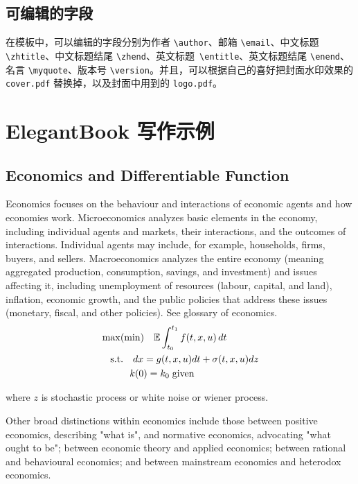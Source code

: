 \documentclass[titlestyle=hang,11pt]{elegantbook}
\begin{document}
\section{可编辑的字段}
在模板中，可以编辑的字段分别为作者 \verb|\author|、邮箱 \verb|\email|、中文标题 \verb|\zhtitle|、中文标题结尾 \verb|\zhend|、英文标题\verb| \entitle|、英文标题结尾 \verb|\enend|、名言 \verb|\myquote|、版本号 \verb|\version|。并且，可以根据自己的喜好把封面水印效果的 \verb|cover.pdf| 替换掉，以及封面中用到的 \verb|logo.pdf|。

\chapter{ElegantBook 写作示例}

\section{Economics and Differentiable Function}

Economics focuses on the behaviour and interactions of economic agents and how economies work. Microeconomics analyzes basic elements in the economy, including individual agents and markets, their interactions, and the outcomes of interactions. Individual agents may include, for example, households, firms, buyers, and sellers. Macroeconomics analyzes the entire economy (meaning aggregated production, consumption, savings, and investment) and issues affecting it, including unemployment of resources (labour, capital, and land), inflation, economic growth, and the public policies that address these issues (monetary, fiscal, and other policies). See glossary of economics.
\begin{align*}
   &\max(\min)\quad \mathbb{E}\int_{t_0}^{t_1}f(t,x,u)\,dt\\
   &\quad\mbox{s.t.} \quad dx=g(t,x,u)dt+\sigma(t,x,u)dz\\
   &\quad \hspace{2.em} k(0)=k_0\;\text{given}
\end{align*}

where $z$ is stochastic process or white noise or wiener process.

Other broad distinctions within economics include those between positive economics, describing "what is", and normative economics, advocating "what ought to be"; between economic theory and applied economics; between rational and behavioural economics; and between mainstream economics and heterodox economics.
\end{document}
